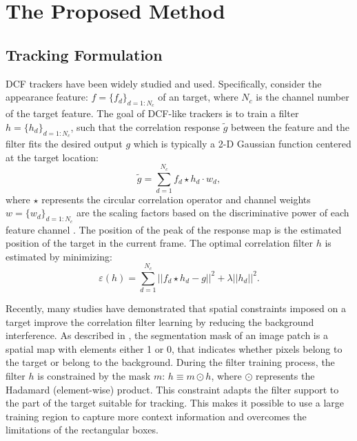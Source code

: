 \section{The Proposed Method}

\subsection{Tracking Formulation}
DCF trackers \cite{Danelljan2014AccurateSE, henriques2014high-speed, Li2014ASA} have been widely studied and used. Specifically, consider the appearance feature: $f=\{f_d\}_{d=1:N_c}$ of an target, where $N_c$ is the channel number of the target feature. The goal of DCF-like trackers is to train a filter $h=\{h_d\}_{d=1:N_c}$, such that the correlation response $\tilde{g}$ between the feature and the filter fits the desired output $g$ which is typically a 2-D Gaussian function centered at the target location: 
\begin{equation} \label{eq:dcf}
\tilde{g}=\sum_{d=1}^{N_c}f_d \star h_d \cdot w_d,
\end{equation}
where $\star$ represents the circular correlation operator and channel weights $w = \{w_d\}_{d=1:N_c}$ are the scaling factors based on the discriminative power of each feature channel \cite{Lukezic2017DiscriminativeCF}.
The position of the peak of the response map is the estimated position of the target in the current frame.
The optimal correlation filter $h$ is estimated by minimizing:
\begin{equation}
\varepsilon(h) = \sum_{d=1}^{N_c}||f_d \star h_d - g||^2+\lambda||h_d||^2.
\end{equation}

Recently, many studies \cite{Danelljan2015LearningSR, Lukezic2017DiscriminativeCF} have demonstrated that spatial constraints imposed on a target improve the correlation filter learning by reducing the background interference. As described in \cite{Lukezic2017DiscriminativeCF}, the segmentation mask of an image patch is a spatial map with elements either 1 or 0, that indicates whether pixels belong to the target or belong to the background. During the filter training process, the filter $h$ is constrained by the mask $m$: $h \equiv m \odot h$, where $\odot$ represents the Hadamard (element-wise) product. This constraint adapts the filter support to the part of the target suitable for tracking. This makes it possible to use a large training region to capture more context information and overcomes the limitations of the rectangular boxes.

